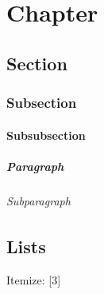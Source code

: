 \documentclass[english,counters by chapter]{uniud}
\begin{document}

\frontmatter

\maketitle

\tableofcontents*


\mainmatter

\chapter{Chapter}
\blindmathtrue

\blindtext

\section{Section}

\blindtext

\subsection{Subsection}

\blindtext

\subsubsection{Subsubsection}

\blindtext

\paragraph{Paragraph}

\blindtext

\subparagraph{Subparagraph}

\blindtext

\section{Lists}

\blindtext[1]
Itemize:
[3]
\end{document}
